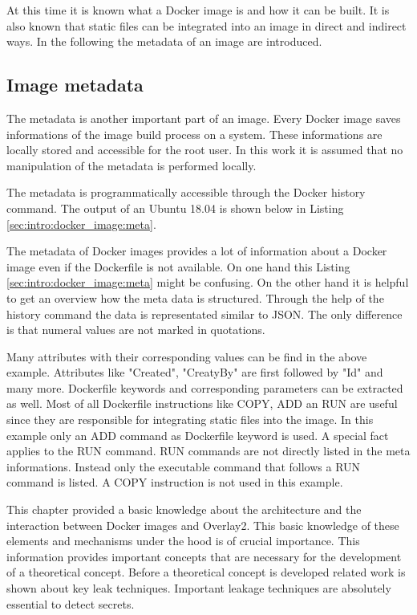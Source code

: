 At this time it is known what a Docker image is and how it can be built. It is also known that static files can be integrated into an image in direct and indirect ways. In the following the metadata of an image are introduced.

\subsection{Image metadata}
\label{sec:intro:docker_image:docker_img:meta}
The metadata is another important part of an image. Every Docker image saves informations of the image build process on a system.  
These informations are locally stored and accessible for the root user. 
In this work it is assumed that no manipulation of the metadata is performed locally. 

The metadata is programmatically accessible through the Docker history command. The output of an Ubuntu 18.04 is shown below in Listing \ref{sec:intro:docker_image:meta}.

The metadata of Docker images provides a lot of information about a Docker image even if the Dockerfile is not available. On one hand this Listing \ref{sec:intro:docker_image:meta} might be confusing. On the other hand it is helpful to get an overview how the meta data is structured. 
Through the help of the history command the data is representated similar to JSON. The only difference is that numeral values are not marked in quotations. 

Many attributes with their corresponding values can be find in the above example. Attributes like "Created", "CreatyBy" are first followed by "Id" and many more. 	
Dockerfile keywords and corresponding parameters can be extracted as well.
Most of all Dockerfile instructions like COPY, ADD an RUN are useful since they are responsible for integrating static files into the image.
In this example only an ADD command as Dockerfile keyword is used.
A special fact applies to the RUN command. RUN commands are not directly listed in the meta informations.
Instead only the executable command that follows a RUN command is listed.
A COPY instruction is not used in this example.

This chapter provided a basic knowledge about the architecture and the interaction between Docker images and Overlay2. This basic knowledge of these elements and mechanisms under the hood is of crucial importance. 
This information provides important concepts that are necessary for the development of a theoretical concept.
Before a theoretical concept is developed related work is shown about key leak techniques. Important leakage techniques are absolutely essential to detect secrets.